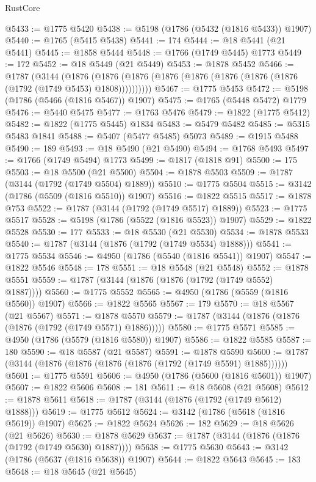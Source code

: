 \begin{lexlean}{RustCore}
\begin{coremodule}
@5433 := @1775 @5420
@5438 := @5198 (@1786 (@5432 (@1816 @5433)) @1907)
@5440 := @1765 (@5415 @5438)
@5441 := 174
@5444 := @18 @5441 (@21 @5441)
@5445 := @1858 @5444
@5448 := @1766 (@1749 @5445) @1773
@5449 := 172
@5452 := @18 @5449 (@21 @5449)
@5453 := @1878 @5452
@5466 := @1787
    (@3144
      (@1876 (@1876 (@1876 (@1876 (@1876 (@1876 (@1876 (@1876 (@1792 (@1749 @5453) @1808))))))))))
@5467 := @1775 @5453
@5472 := @5198 (@1786 (@5466 (@1816 @5467)) @1907)
@5475 := @1765 (@5448 @5472) @1779
@5476 := @5440 @5475
@5477 := @1763 @5476
@5479 := @1822 (@1775 @5412)
@5482 := @1822 (@1775 @5445) @1834
@5483 := @5479 @5482
@5485 := @5315 @5483 @1841
@5488 := @5407 (@5477 @5485) @5073
@5489 := @1915 @5488
@5490 := 189
@5493 := @18 @5490 (@21 @5490)
@5494 := @1768 @5493
@5497 := @1766 (@1749 @5494) @1773
@5499 := @1817 (@1818 @91)
@5500 := 175
@5503 := @18 @5500 (@21 @5500)
@5504 := @1878 @5503
@5509 := @1787 (@3144 (@1792 (@1749 @5504) @1889))
@5510 := @1775 @5504
@5515 := @3142 (@1786 (@5509 (@1816 @5510)) @1907)
@5516 := @1822 @5515
@5517 := @1878 @753
@5522 := @1787 (@3144 (@1792 (@1749 @5517) @1889))
@5523 := @1775 @5517
@5528 := @5198 (@1786 (@5522 (@1816 @5523)) @1907)
@5529 := @1822 @5528
@5530 := 177
@5533 := @18 @5530 (@21 @5530)
@5534 := @1878 @5533
@5540 := @1787 (@3144 (@1876 (@1792 (@1749 @5534) @1888)))
@5541 := @1775 @5534
@5546 := @4950 (@1786 (@5540 (@1816 @5541)) @1907)
@5547 := @1822 @5546
@5548 := 178
@5551 := @18 @5548 (@21 @5548)
@5552 := @1878 @5551
@5559 := @1787 (@3144 (@1876 (@1876 (@1792 (@1749 @5552) @1887))))
@5560 := @1775 @5552
@5565 := @4950 (@1786 (@5559 (@1816 @5560)) @1907)
@5566 := @1822 @5565
@5567 := 179
@5570 := @18 @5567 (@21 @5567)
@5571 := @1878 @5570
@5579 := @1787 (@3144 (@1876 (@1876 (@1876 (@1792 (@1749 @5571) @1886)))))
@5580 := @1775 @5571
@5585 := @4950 (@1786 (@5579 (@1816 @5580)) @1907)
@5586 := @1822 @5585
@5587 := 180
@5590 := @18 @5587 (@21 @5587)
@5591 := @1878 @5590
@5600 := @1787 (@3144 (@1876 (@1876 (@1876 (@1876 (@1792 (@1749 @5591) @1885))))))
@5601 := @1775 @5591
@5606 := @4950 (@1786 (@5600 (@1816 @5601)) @1907)
@5607 := @1822 @5606
@5608 := 181
@5611 := @18 @5608 (@21 @5608)
@5612 := @1878 @5611
@5618 := @1787 (@3144 (@1876 (@1792 (@1749 @5612) @1888)))
@5619 := @1775 @5612
@5624 := @3142 (@1786 (@5618 (@1816 @5619)) @1907)
@5625 := @1822 @5624
@5626 := 182
@5629 := @18 @5626 (@21 @5626)
@5630 := @1878 @5629
@5637 := @1787 (@3144 (@1876 (@1876 (@1792 (@1749 @5630) @1887))))
@5638 := @1775 @5630
@5643 := @3142 (@1786 (@5637 (@1816 @5638)) @1907)
@5644 := @1822 @5643
@5645 := 183
@5648 := @18 @5645 (@21 @5645)

\end{coremodule}
\end{lexlean}
